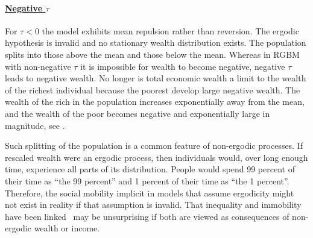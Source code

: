 \paragraph{\underline{Negative $\tau$}}
\mbox{}

For $\tau<0$ the model exhibits mean repulsion rather than reversion. The ergodic hypothesis is invalid and no stationary wealth distribution exists. The population splits into those above the mean and those below the mean. Whereas in RGBM with non-negative $\tau$ it is impossible for wealth to become negative, negative $\tau$ leads to negative wealth. No longer is total economic wealth a limit to the wealth of the richest individual because the poorest develop large negative wealth. The wealth of the rich in the population increases exponentially away from the mean, and the wealth of the poor becomes negative and exponentially large in magnitude, see .

Such splitting of the population is a common feature of non-ergodic processes. If rescaled wealth were an ergodic process, then individuals would, over long enough time, experience all parts of its distribution. People would spend 99 percent of their time as ``the 99 percent'' and 1 percent of their time as ``the 1 percent''. Therefore, the social mobility implicit in models that assume ergodicity might not exist in reality if that assumption is invalid. That inequality and immobility have been linked~\cite{Corak2013,LiuETAL2013,berman2017} may be unsurprising if both are viewed as consequences of non-ergodic wealth or income.

